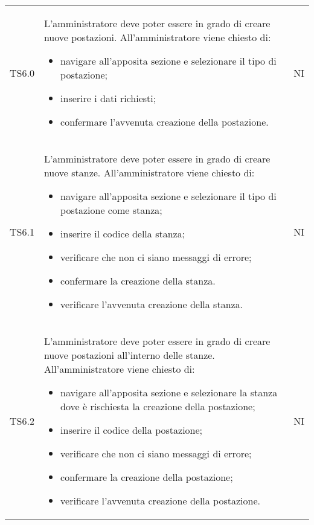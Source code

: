{\begin{longtable}{ c C{11cm} c }
        TS6.0&
        L'amministratore deve poter essere in grado di creare nuove postazioni.\newline
        All'amministratore viene chiesto di:
        \begin{itemize}
            \item navigare all'apposita sezione e selezionare il tipo di postazione;
            \item inserire i dati richiesti;
            \item confermare l'avvenuta creazione della postazione.
        \end{itemize}&
        NI\\

        TS6.1&
        L'amministratore deve poter essere in grado di creare nuove stanze.\newline
        All'amministratore viene chiesto di:
        \begin{itemize}
            \item navigare all'apposita sezione e selezionare il tipo di postazione come stanza;
            \item inserire il codice della stanza;
            \item verificare che non ci siano messaggi di errore;
            \item confermare la creazione della stanza.
            \item verificare l'avvenuta creazione della stanza.
        \end{itemize}&
        NI\\

        TS6.2&
        L'amministratore deve poter essere in grado di creare nuove postazioni all'interno delle stanze.\newline
        All'amministratore viene chiesto di:
        \begin{itemize}
            \item navigare all'apposita sezione e selezionare la stanza dove è rischiesta la creazione della postazione;
            \item inserire il codice della postazione;
            \item verificare che non ci siano messaggi di errore;
            \item confermare la creazione della postazione;
            \item verificare l'avvenuta creazione della postazione.
        \end{itemize}&
        NI\\


\end{longtable}}
